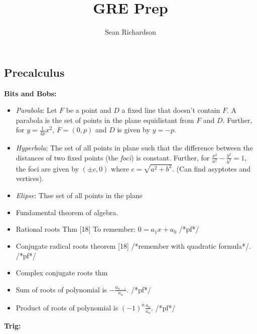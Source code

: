 \documentclass[12pt]{amsart}
\begin{document}
\title{GRE Prep}
\author{Sean Richardson}
\maketitle

\begin{multicols}{2}
\section{Precalculus}
\textbf{Bits and Bobs:}
\begin{itemize}
    \item \emph{Parabola}: Let $F$ be a point and $D$ a fixed line that
        doesn't contain $F$. A parabola is the set of points in the plane
        equidistant from $F$ and $D$. Further, for $y = \frac{1}{4p} x^2$, $F = (0,p)$ and $D$ is given by $y = -p$.
    \item \emph{Hyperbola}: The set of all points in plane such that the
    difference between the distances of two fixed points (the \emph{foci})
    is constant. Further, for $\frac{x^2}{a^2} - \frac{y^2}{b^2} = 1$, the
    foci are given by $(\pm c, 0)$ where $c = \sqrt{a^2+b^2}$. (Can find
        asyptotes and vertices).
    \item \emph{Elipse}: Thse set of all points in the plane 
    \item Fundamental theorem of algebra.
    \item Rational roots Thm [18] To remember: $0 = a_1x+a_0$ /*pf*/
    \item Conjugate radical roots theorem [18] /*remember with quadratic
        formula*/. /*pf*/
    \item Complex conjugate roots thm
    \item Sum of roots of polynomial is $-\frac{a_{n-1}}{a_n}$. /*pf*/
    \item Product of roots of polynomial is $(-1)^n\frac{a_0}{a_n}$. /*pf*/
\end{itemize}
\textbf{Trig:}
\end{multicols}
\end{document}
